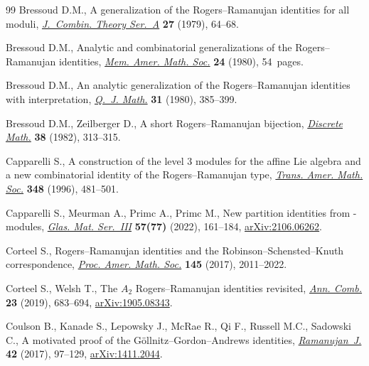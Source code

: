 \begin{thebibliography}{99}
Bressoud D.M., A generalization of the {R}ogers--{R}amanujan identities for all
 moduli,
 \href{https://doi.org/10.1016/0097-3165(79)90008-6}{\textit{J.~Combin. Theory
 Ser.~A}} \textbf{27} (1979), 64--68.

Bressoud D.M., Analytic and combinatorial generalizations of the
 {R}ogers--{R}amanujan identities,
 \href{https://doi.org/10.1090/memo/0227}{\textit{Mem. Amer. Math. Soc.}}
 \textbf{24} (1980), 54~pages.

Bressoud D.M., An analytic generalization of the {R}ogers--{R}amanujan
 identities with interpretation,
 \href{https://doi.org/10.1093/qmath/31.4.385}{\textit{Q.~J. Math.}}
 \textbf{31} (1980), 385--399.

Bressoud D.M., Zeilberger D., A short {R}ogers--{R}amanujan bijection,
 \href{https://doi.org/10.1016/0012-365X(82)90298-9}{\textit{Discrete Math.}}
 \textbf{38} (1982), 313--315.

Capparelli S., A construction of the level {$3$} modules for the affine {L}ie
 algebra  and a new combinatorial identity of the
 {R}ogers--{R}amanujan type,
 \href{https://doi.org/10.1090/S0002-9947-96-01535-8}{\textit{Trans. Amer.
 Math. Soc.}} \textbf{348} (1996), 481--501.

Capparelli S., Meurman A., Primc A., Primc M., New partition identities from
 -modules,
 \href{https://doi.org/10.3336/gm.57.2.01}{\textit{Glas. Mat. Ser.~III}}
 \textbf{57(77)} (2022), 161--184,
 \href{http://arxiv.org/abs/2106.06262}{arXiv:2106.06262}.

Corteel S., Rogers--{R}amanujan identities and the
 {R}obinson--{S}chensted--{K}nuth correspondence,
 \href{https://doi.org/10.1090/proc/13373}{\textit{Proc. Amer. Math. Soc.}}
 \textbf{145} (2017), 2011--2022.

Corteel S., Welsh T., The {$A_2$} {R}ogers--{R}amanujan identities revisited,
 \href{https://doi.org/10.1007/s00026-019-00446-7}{\textit{Ann. Comb.}}
 \textbf{23} (2019), 683--694,
 \href{http://arxiv.org/abs/1905.08343}{arXiv:1905.08343}.

Coulson B., Kanade S., Lepowsky J., McRae R., Qi F., Russell M.C., Sadowski C.,
 A motivated proof of the {G}\"{o}llnitz--{G}ordon--{A}ndrews identities,
 \href{https://doi.org/10.1007/s11139-015-9722-8}{\textit{Ramanujan~J.}}
 \textbf{42} (2017), 97--129,
 \href{http://arxiv.org/abs/1411.2044}{arXiv:1411.2044}.


\end{thebibliography}
